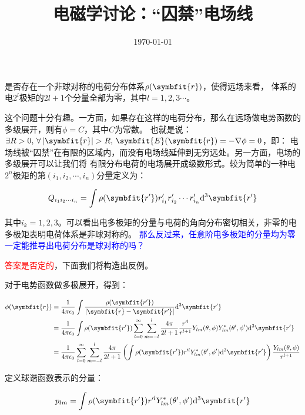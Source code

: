 \documentclass[11pt,a4paper]{ctexart}
\title{电磁学讨论：“囚禁”电场线}
\author{}
\date{\today}
\newcommand{\dd}{\mathrm{d}}
\begin{document}
\maketitle

{
    \kaishu 是否存在一个非球对称的电荷分布体系$\rho(\symbfit{r})$，使得远场来看，
    体系的电$2^l$极矩的$2l+1$个分量全部为零，其中$l=1,2,3\cdots$。
    \label{question}
}

\bigskip

这个问题十分有趣。一方面，如果存在这样的电荷分布，那么在远场做电势函数的多级展开，则有$\phi=C$，其中$C$为常数。
也就是说：$\exists R>0,\,\forall\left|\symbfit{r}\right|>R,\,\symbfit{E}(\symbfit{r})=-\nabla\phi=0$，即：
电场线被“囚禁”在有限的区域内，而没有电场线延伸到无穷远处。另一方面，电场的多级展开可以让我们将
有限分布电荷的电场展开成级数形式。较为简单的一种电$2^n$极矩的第$(i_1,i_2,\cdots,i_n)$分量定义为：

\begin{equation}
    Q_{i_1i_2\cdots i_n}=\int\rho(\symbfit{r'})r'_{i_1}r'_{i_2}\cdots r'_{i_n}\dd^3\symbfit{r'}
    \label{eq:define}
\end{equation}

其中$i_k=1,2,3$。可以看出电多极矩的分量与电荷的角向分布密切相关，非零的电多极矩表明电荷体系是非球对称的。
\textcolor{blue}{那么反过来，任意阶电多极矩的分量均为零一定能推导出电荷分布是球对称的吗？}

\bigskip

\textcolor{red}{答案是否定的}，下面我们将构造出反例。

\bigskip

对于电势函数做多极展开，得到：

\begin{align}
    \phi(\symbfit{r})&=\frac{1}{4\pi\epsilon_0}\int\frac{\rho(\symbfit{r'})}{\left|\symbfit{r}-\symbfit{r'}\right|}\dd^3\symbfit{r'} \notag \\
    &=\frac{1}{4\pi\epsilon_0}\int\rho(\symbfit{r'})\sum_{l=0}^{\infty}\sum_{m=-l}^{l}\frac{4\pi}{2l+1}\frac{r'^l}{r^{l+1}}Y_{lm}(\theta,\phi)Y_{lm}^*(\theta',\phi')\dd^3\symbfit{r'} \notag\\
    &=\frac{1}{4\pi\epsilon_0}\sum_{l=0}^{\infty}\sum_{m=-l}^{l}\frac{4\pi}{2l+1}\left(\int\rho(\symbfit{r'})r'^lY_{lm}^*(\theta',\phi')\dd^3\symbfit{r'}\right)\frac{Y_{lm}(\theta,\phi)}{r^{l+1}}
    \label{eq:Multipole}
\end{align}

定义球谐函数表示的分量：

\begin{equation}
    p_{lm}=\int\rho(\symbfit{r'})r'^lY_{lm}^*(\theta',\phi')\dd^3\symbfit{r'}
\end{equation}
\end{document}
